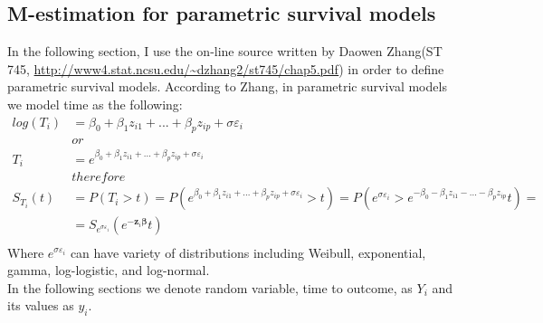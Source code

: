 \documentclass[]{article}
\let\epsilon\varepsilon
\begin{document}
%
%
  



\subsection{M-estimation for parametric survival models}
In the following section, I use the on-line source written by Daowen Zhang(ST 745,  \url{http://www4.stat.ncsu.edu/~dzhang2/st745/chap5.pdf}) in order to define parametric survival models. According to Zhang, in parametric survival models we model time as the following:
  $$
  \begin{aligned}
    log(T_i) &= \beta_0 + \beta_1z_{i1} + ... + \beta_p z_{ip} + \sigma \epsilon_{i}\\
    &or\\
    T_i &= e^{\beta_0 + \beta_1z_{i1} + ... + \beta_p z_{ip} + \sigma \epsilon_{i}}\\
    &therefore\\
    S_{T_i}(t) &= P(T_i>t) = P\left( e^{\beta_0 + \beta_1z_{i1} + ... + \beta_p z_{ip} + \sigma \epsilon_{i}} >t \right ) = P\left( e^{\sigma \epsilon_{i}} > e^{-\beta_0 - \beta_1z_{i1} - ... - \beta_p z_{ip}}t \right )=\\
    &=S_{e^{\sigma \epsilon_{i}}}(e^{-\pmb{z}_i \pmb{\beta}}t)\\
  \end{aligned}
  $$
Where $e^{\sigma \epsilon_{i}}$ can have variety of distributions including Weibull, exponential, gamma, log-logistic, and log-normal.\\
In the following sections we denote random variable, time to outcome, as $Y_i$ and its values as $y_i$. 
\end{document}
